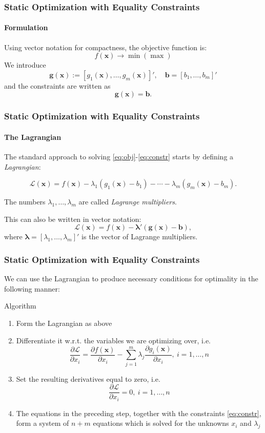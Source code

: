 \documentclass[10pt]{beamer}
\theoremstyle{definition}
\begin{document}
\begin{frame}[fragile]
\frametitle{Static Optimization with Equality Constraints}
\framesubtitle{Formulation}
Using vector notation for compactness, the objective function is:
\[ f(\mathbf{x}) \rightarrow \min (\max) \]
We introduce
\[ \mathbf{g}(\mathbf{x}):= [g_1(\mathbf{x}),\ldots,g_m(\mathbf{x})]',\quad \mathbf{b} = [b_1,\ldots,b_m]' \]
and the constraints are written as 
\[ \mathbf{g}(\mathbf{x})=\mathbf{b}. \]
\end{frame}

\begin{frame}[fragile]
\frametitle{Static Optimization with Equality Constraints}
\framesubtitle{The Lagrangian}
The standard approach to solving \eqref{eq:obj}-\eqref{eq:constr} starts by defining a \emph{Lagrangian}:

\[ \mathcal{L}(\mathbf{x}) = f(\mathbf{x}) - \lambda_1 (g_1(\mathbf{x})-b_1) - \cdots - \lambda_m (g_m(\mathbf{x})-b_m). \]\bigskip

The numbers $ \lambda_1,\ldots,\lambda_m $ are called \emph{Lagrange multipliers}.\bigskip

This can also be written in vector notation:
\[ \mathcal{L}(\mathbf{x}) = f(\mathbf{x}) - \boldsymbol{\lambda}' (\mathbf{g}(\mathbf{x})-\mathbf{b}) , \] 
where $ \boldsymbol{\lambda }= [\lambda_1,\ldots,\lambda_m]' $ is the vector of Lagrange multipliers.
\end{frame}

\begin{frame}[fragile]
\frametitle{Static Optimization with Equality Constraints}
We can use the Lagrangian to produce necessary conditions for optimality in the following manner:

\begin{block}{Algorithm}
\begin{enumerate}
\item Form the Lagrangian as above
\item Differentiate it w.r.t. the variables we are optimizing over, i.e.
\[ \dfrac{\partial \mathcal{L}}{\partial x_i} = \dfrac{\partial f(\mathbf{x})}{\partial x_i} - \sum_{j=1}^{m}\lambda_j \dfrac{\partial g_i(\mathbf{x})}{\partial x_i},~i=1,\ldots,n \]
\item Set the resulting derivatives equal to zero, i.e.
\[ \dfrac{\partial \mathcal{L}}{\partial x_i} = 0,~i=1,\ldots,n \]
\item The equations in the preceding step, together with the constraints \eqref{eq:constr}, form a system of $ n+m $ equations which is solved for the unknowns $ x_i $ and $ \lambda_j $
\end{enumerate}
\end{block}
\end{frame}
\end{document}
